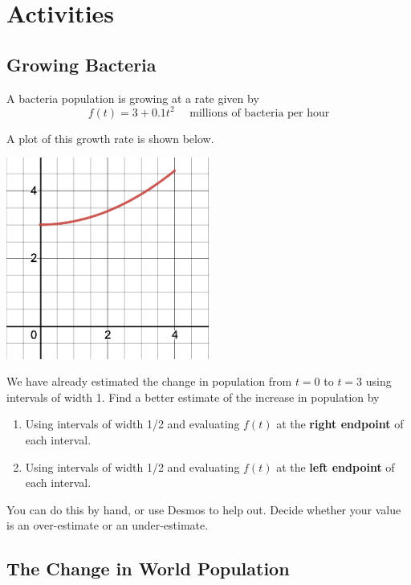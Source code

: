 \documentclass[
]{book}
\providecommand{\tightlist}{%
  \setlength{\itemsep}{0pt}\setlength{\parskip}{0pt}}
\begin{document}
\hypertarget{activities-21}{%
\section{Activities}\label{activities-21}}

\hypertarget{growing-bacteria}{%
\subsection{Growing Bacteria}\label{growing-bacteria}}

A bacteria population is growing at a rate given by
\[f(t)=3+0.1t^2 \quad \text{  millions of bacteria per hour}\]

A plot of this growth rate is shown below.

\includegraphics[width=0.5\textwidth,height=\textheight]{images/integrate-intro.png}

We have already estimated the change in population from \(t=0\) to \(t=3\) using intervals of width 1. Find a better estimate of the increase in population by

\begin{enumerate}
\def\labelenumi{\arabic{enumi}.}
\tightlist
\item
  Using intervals of width 1/2 and evaluating \(f(t)\) at the \textbf{right endpoint} of each interval.
\item
  Using intervals of width 1/2 and evaluating \(f(t)\) at the \textbf{left endpoint} of each interval.
\end{enumerate}

You can do this by hand, or use Desmos to help out. Decide whether your value is an over-estimate or an under-estimate.

\hypertarget{the-change-in-world-population}{%
\subsection{The Change in World Population}\label{the-change-in-world-population}}
\end{document}
